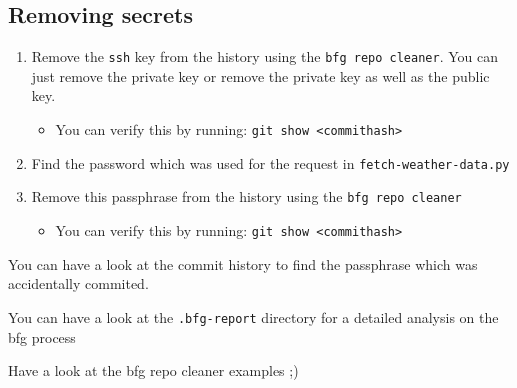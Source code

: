 \documentclass[paper=a4]{scrartcl}
\begin{document}
	\subsection*{Removing secrets}
		\begin{enumerate}
			\item Remove the \texttt{ssh} key from the history using the \texttt{bfg repo cleaner}. You can just remove the private key or remove the private key as well as the public key.
				\begin{itemize}
					\item 	You can verify this by running: \texttt{git show <commithash>}
				\end{itemize}
			\item Find the password which was used for the request in \texttt{fetch-weather-data.py}
			\item Remove this passphrase from the history using the \texttt{bfg repo cleaner}
				\begin{itemize}
					\item 	You can verify this by running: \texttt{git show <commithash>}
				\end{itemize}
		\end{enumerate}

	\begin{hints}
  		\item 	You can have a look at the commit history to find the passphrase which was accidentally commited.
  		\item 	You can have a look at the \texttt{.bfg-report} directory for a detailed analysis on the bfg process
  		\item 	Have a look at the bfg repo cleaner examples ;)
	\end{hints}
\end{document}
